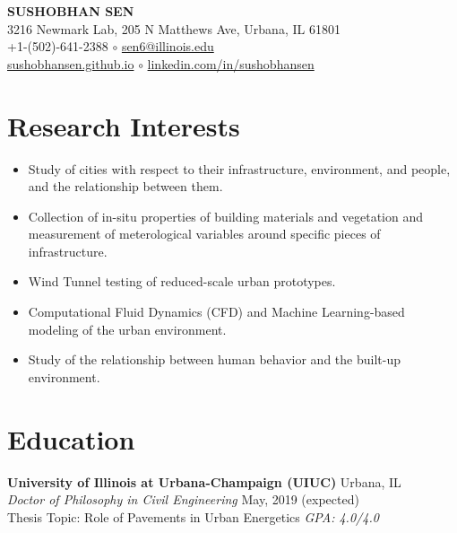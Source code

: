 \documentclass[12pt]{article}
\begin{document}
 \sloppy %
\begin{center}
{\large \uppercase{\textbf{Sushobhan Sen}}} \\
3216 Newmark Lab, 205 N Matthews Ave, Urbana, IL 61801 \\
+1-(502)-641-2388 $\circ$ \href{mailto:sen6@illinois.edu}{sen6@illinois.edu} \\
\href{http://sushobhansen.github.io/}{sushobhansen.github.io} $\circ$ \href{http://linkedin.com/in/sushobhansen}{linkedin.com/in/sushobhansen}
\end{center} 

\hfill \break %
\section*{Research Interests}
\begin{itemize}
	\item Study of cities with respect to their infrastructure, environment, and people, and the relationship between them.
	\item Collection of in-situ properties of building materials and vegetation and measurement of meterological variables around specific pieces of infrastructure. 
	\item Wind Tunnel testing of reduced-scale urban prototypes.
	\item Computational Fluid Dynamics (CFD) and Machine Learning-based modeling of the urban environment. 
	\item Study of the relationship between human behavior and the built-up environment.
\end{itemize}
 

\section*{Education}
\textbf{University of Illinois at Urbana-Champaign (UIUC)} \hfill Urbana, IL\\
\textit{Doctor of Philosophy in Civil Engineering} \hfill May, 2019 (expected)\\
Thesis Topic: Role of Pavements in Urban Energetics \hfill \textit{GPA: 4.0/4.0} \\
\end{document}
